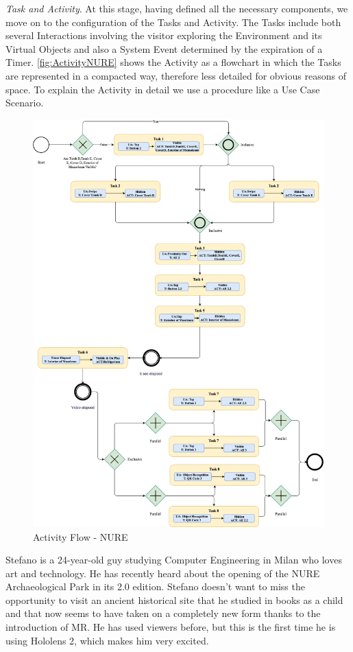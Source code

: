 \emph{Task and Activity}. At this stage, having defined all the necessary components, we move on to the configuration of the Tasks and Activity. The Tasks include both several Interactions involving the visitor exploring the Environment and its Virtual Objects and also a System Event determined by the expiration of a Timer. \autoref{fig:ActivityNURE} shows the Activity as a flowchart in which the Tasks are represented in a compacted way, therefore less detailed for obvious reasons of space. To explain the Activity in detail we use a procedure like a Use Case Scenario. 
\begin{figure}[h]
	\centering
	\includegraphics[width=16.5cm]{Figures/Conceptual Model/NUREExample.png}
	\caption{Activity Flow - NURE}
	\label{fig:ActivityNURE}
\end{figure}
Stefano is a 24-year-old guy studying Computer Engineering in Milan who loves art and technology. He has recently heard about the opening of the NURE Archaeological Park in its 2.0 edition. Stefano doesn't want to miss the opportunity to visit an ancient historical site that he studied in books as a child and that now seems to have taken on a completely new form thanks to the introduction of MR. He has used viewers before, but this is the first time he is using Hololens 2, which makes him very excited. 


